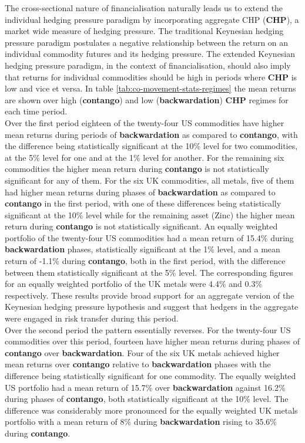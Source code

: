 \documentclass[]{elsarticle} %
\begin{document}
The cross-sectional nature of financialisation naturally leads us to extend the individual hedging pressure paradigm by incorporating aggregate CHP (\textbf{CHP}), a market wide measure of hedging pressure. The traditional Keynesian hedging pressure paradigm postulates a negative relationship between the return on an individual commodity futures and its hedging pressure. The extended Keynesian hedging pressure paradigm, in the context of financialisation, should also imply that returns for individual commodities should be high in periods where \textbf{CHP} is low and vice et versa. In table \ref{tab:co-movement-stats-regimes} the mean returns are shown over high (\textbf{contango}) and low (\textbf{backwardation}) \textbf{CHP} regimes for each time period.\\
Over the first period eighteen of the twenty-four US commodities have higher mean returns during periods of \textbf{backwardation} as compared to \textbf{contango}, with the difference being statistically significant at the 10\% level for two commodities, at the 5\% level for one and at the 1\% level for another. For the remaining six commodities the higher mean return during \textbf{contango} is not statistically significant for any of them. For the six UK commodities, all metals, five of them had higher mean returns during phases of \textbf{backwardation} as compared to \textbf{contango} in the first period, with one of these differences being statistically significant at the 10\% level while for the remaining asset (Zinc) the higher mean return during \textbf{contango} is not statistically significant. An equally weighted portfolio of the twenty-four US commodities had a mean return of 15.4\% during \textbf{backwardation} phases, statistically significant at the 1\% level, and a mean return of -1.1\% during \textbf{contango}, both in the first period, with the difference between them statistically significant at the 5\% level. The corresponding figures for an equally weighted portfolio of the UK metals were 4.4\% and 0.3\% respectively. These results provide broad support for an aggregate version of the Keynesian hedging pressure hypothesis and suggest that hedgers in the aggregate were engaged in risk transfer during this period.\\
Over the second period the pattern essentially reverses. For the twenty-four US commodities over this period, fourteen have higher mean returns during phases of \textbf{contango} over \textbf{backwardation}. Four of the six UK metals achieved higher mean returns over \textbf{contango} relative to \textbf{backwardation} phases with the difference being statistically significant for one commodity. The equally weighted US portfolio had a mean return of 15.7\% over \textbf{backwardation} against 16.2\% during phases of \textbf{contango}, both statistically significant at the 10\% level. The difference was considerably more pronounced for the equally weighted UK metals portfolio with a mean return of 8\% during \textbf{backwardation} rising to 35.6\% during \textbf{contango}.
\end{document}
